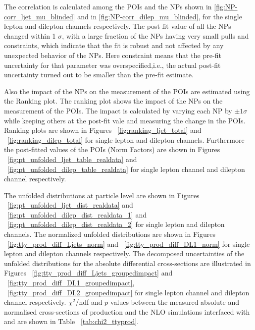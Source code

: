 The correlation is calculated among the POIs and the NPs shown in \cref{fig:NP-corr_ljet_mu_blinded} and in \cref{fig:NP-corr_dilep_mu_blinded}, for the single lepton and dilepton channels respectively. The post-fit value of all the NPs changed within 1 $\sigma$, with a large fraction of the NPs having very small pulls and constraints, which indicate that the fit is robust and not affected by any unexpected behavior of the NPs. Here constraint means that the pre-fit uncertainty for that parameter was overspecified,i.e., the actual post-fit uncertainty turned out to be smaller than the pre-fit estimate. %

Also the impact of the NPs on the measurement of the POIs are estimated using the Ranking plot. 
The ranking plot shows the impact of the NPs on the measurement of the POIs. The impact is calculated by varying each NP by $\pm 1 \sigma$ while keeping others at the post-fit vale and measuring the change in the POIs. Ranking plots are shown in Figures ~\ref{fig:ranking_ljet_total} and ~\ref{fig:ranking_dilep_total} for single lepton and dilepton channels. Furthermore the post-fitted values of the POIs (Norm Factors) are shown in Figures ~\ref{fig:pt_unfolded_ljet_table_realdata} and ~\ref{fig:pt_unfolded_dilep_table_realdata} for single lepton channel and dilepton channel respectively. %

The unfolded distributions at particle level are shown in Figures ~\ref{fig:pt_unfolded_ljet_dist_realdata} and ~\ref{fig:pt_unfolded_dilep_dist_realdata_1} and ~\ref{fig:pt_unfolded_dilep_dist_realdata_2} for single lepton and dilepton channels. The normalized unfolded distributions are shown in Figures ~\ref{fig:tty_prod_diff_Ljets_norm} and ~\ref{fig:tty_prod_diff_DL1_norm} for single lepton and dilepton channels respectively. The decomposed uncertainties of the unfolded distributions for the absolute differential cross-sections are illustrated in Figures ~\ref{fig:tty_prod_diff_Ljets_groupedimpact} and ~\ref{fig:tty_prod_diff_DL1_groupedimpact}, ~\ref{fig:tty_prod_diff_DL2_groupedimpact} for single lepton channel and dilepton channel respectively. $\chi^2$/ndf and $p$-values between the measured absolute and normalised cross-sections of \tty production and the NLO \MGNLO simulations interfaced with \PYTHIA[8] and \HERWIG[7] are shown in Table ~\ref{tab:chi2_ttyprod}.





